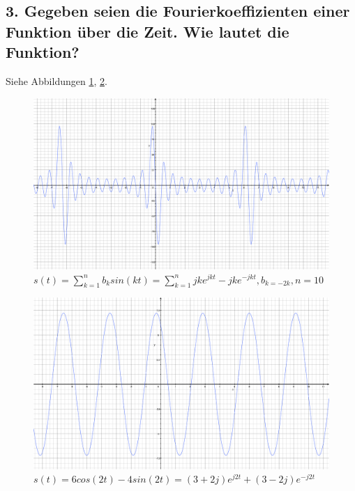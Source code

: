 \subsection*{3. Gegeben seien die Fourierkoeffizienten einer Funktion \"uber die Zeit. Wie lautet die Funktion?}
Siehe Abbildungen \ref{fig:3.3.a},  \ref{fig:3.3.b}.
\begin{figure}[p] %
   \centering
   \includegraphics[width=1.0\textwidth]{Uebung3/Aufgabe_3_3_a_1.pdf} 
   \caption{$s(t)=\sum_{k=1}^n b_{k}sin(kt)=\sum_{k=1}^{n} jke^{jkt}-jke^{-jkt}, b_{k=-2k}, n=10$}
   \label{fig:3.3.a}
\end{figure}
\begin{figure}[p] %
   \centering
   \includegraphics[width=1.0\textwidth]{Uebung3/Aufgabe_3_3_b.pdf} 
   \caption{$s(t)= 6cos(2t)-4sin(2t)=(3+2j)e^{j2t}+(3-2j)e^{-j2t}$}
   \label{fig:3.3.b}
\end{figure}